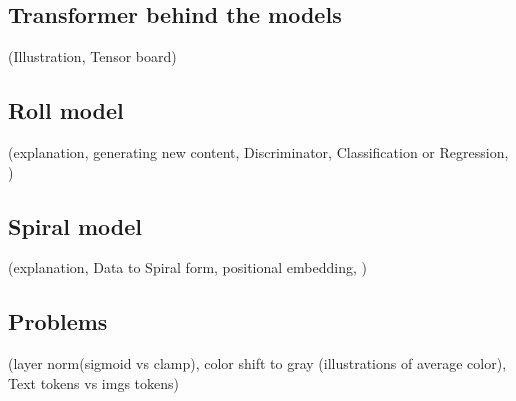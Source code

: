 \subsection{Transformer behind the models}
    (Illustration, Tensor board)

\subsection{Roll model}
    (explanation, generating new content, Discriminator, Classification or Regression, )    

\subsection{Spiral model}
    (explanation, Data to Spiral form, positional embedding, )

\subsection{Problems}
    (layer norm(sigmoid vs clamp), color shift to gray (illustrations of average color), Text tokens vs imgs tokens)
